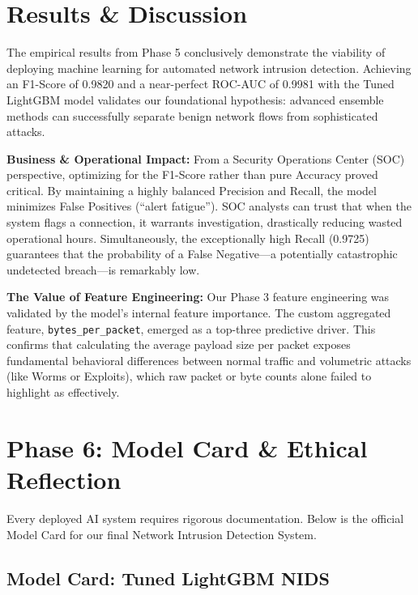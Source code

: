 \documentclass[12pt, a4paper]{article}
\begin{document}
\section{Results \& Discussion}

The empirical results from Phase 5 conclusively demonstrate the viability of deploying machine learning for automated network intrusion detection. Achieving an F1-Score of 0.9820 and a near-perfect ROC-AUC of 0.9981 with the Tuned LightGBM model validates our foundational hypothesis: advanced ensemble methods can successfully separate benign network flows from sophisticated attacks.

\textbf{Business \& Operational Impact:}
From a Security Operations Center (SOC) perspective, optimizing for the F1-Score rather than pure Accuracy proved critical. By maintaining a highly balanced Precision and Recall, the model minimizes False Positives (``alert fatigue''). SOC analysts can trust that when the system flags a connection, it warrants investigation, drastically reducing wasted operational hours. Simultaneously, the exceptionally high Recall (0.9725) guarantees that the probability of a False Negative---a potentially catastrophic undetected breach---is remarkably low.

\textbf{The Value of Feature Engineering:}
Our Phase 3 feature engineering was validated by the model's internal feature importance. The custom aggregated feature, \texttt{bytes\_per\_packet}, emerged as a top-three predictive driver. This confirms that calculating the average payload size per packet exposes fundamental behavioral differences between normal traffic and volumetric attacks (like Worms or Exploits), which raw packet or byte counts alone failed to highlight as effectively.

\section{Phase 6: Model Card \& Ethical Reflection}

Every deployed AI system requires rigorous documentation. Below is the official Model Card for our final Network Intrusion Detection System.

\subsection{Model Card: Tuned LightGBM NIDS}
\end{document}
